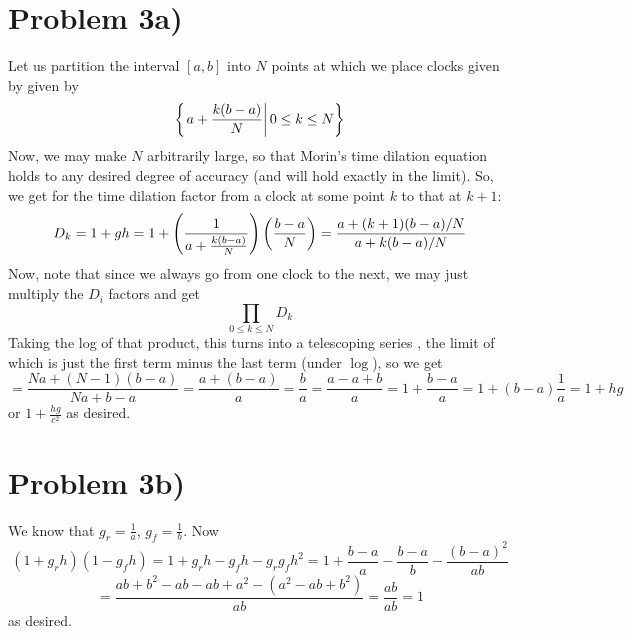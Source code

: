 \section*{Problem 3a)}
Let us partition the interval $[a,b]$ into $N$ points at which we place clocks given by given by
\[ \left\{ \left. a+\frac{k(b-a)}{N} \right| 0 \leq k \leq N  \right\} \]
Now, we may make $N$ arbitrarily large, so that Morin's time dilation equation holds to any desired degree of accuracy (and will hold exactly in the limit). So, we get for the time dilation factor from a clock at some point $k$ to that at $k+1$:
\[ D_k = 1 + gh = 1 + \left( \frac{1}{a+\frac{k(b-a)}{N}}  \right)\left(\frac{b-a}{N} \right) = \frac{a+(k+1)(b-a)/N}{a+k(b-a)/N} \]
Now, note that since we always go from one clock to the next, we may just multiply the $D_i$ factors and get
\[ \prod_{0 \leq k \leq N} D_k \]
Taking the log of that product, this turns into a telescoping series , the limit of which is just the first term minus the last term (under $\log$), so we get
\[ = \dfrac{Na+(N-1)(b-a)}{Na+b-a} = \dfrac{a+(b-a)}{a} = \frac{b}{a} = \frac{a-a+b}{a} = 1 + \frac{b-a}{a} = 1+(b-a) \frac{1}{a} = 1 + hg \]
or $1+\frac{hg}{c^2}$ as desired.
\section*{Problem 3b)}
We know that $g_r = \frac{1}{a}$, $g_f = \frac{1}{b}$. Now
\[ (1+g_rh)(1-g_fh) = 1+g_rh - g_fh -g_rg_fh^2 = 1 + \frac{b-a}{a} - \frac{b-a}{b} - \frac{(b-a)^2}{ab} \]\[ = \frac{ab + b^2 - ab - ab + a^2 - (a^2-ab+b^2)}{ab} = \frac{ab}{ab} =1 \]
as desired.
